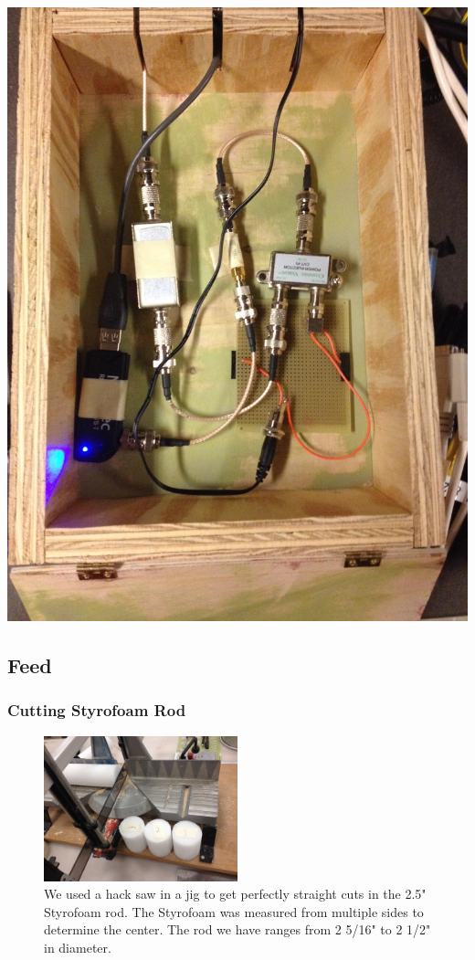 \documentclass[11pt]{article} %
\begin{document}
\begin{center}
\includegraphics[scale=0.20]{lnainterface/06.jpeg}
\end{center}



\subsection{Feed}

\subsubsection{Cutting Styrofoam Rod}



\begin{figure}
  \centering
  \caption{We used a hack saw in a jig to get perfectly straight cuts in the 2.5" Styrofoam rod. The Styrofoam was measured from multiple sides to determine the center. The rod we have ranges from 2 5/16" to 2 1/2" in diameter.}
  \includegraphics[width=0.50\textwidth]{feed/01.jpeg}
\end{figure}
\end{document}
